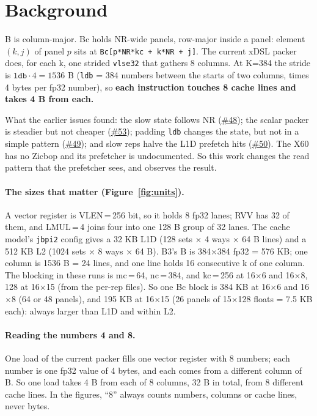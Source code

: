\documentclass[10pt,a4paper]{article}
\newcommand{\iss}[1]{\href{https://github.com/JieGH/RVV_code_gen_via_MLIR_xDSL/issues/#1}{\##1}}
\newcommand{\key}[1]{\textbf{\textcolor{blue!55!black}{#1}}}  %
\begin{document}
\section{Background}
B is column-major. Bc holds NR-wide panels, row-major inside a panel: element $(k,j)$ of panel $p$ sits at
\texttt{Bc[p*NR*kc + k*NR + j]}. The current xDSL packer does, for each k, one strided \texttt{vlse32} that gathers 8 columns.
At K=384 the stride is $\texttt{ldb}\cdot 4 = 1536$ B (\texttt{ldb} = 384 numbers between the starts of two columns, times 4 bytes per
fp32 number), so \key{each instruction touches 8 cache lines and takes 4 B from each.}

What the earlier issues found: the slow state follows NR (\iss{48}); the scalar packer is steadier but not cheaper (\iss{53});
padding \texttt{ldb} changes the state, but not in a simple pattern (\iss{49}); and slow reps halve the L1D prefetch hits (\iss{50}).
The X60 has no Zicbop and its prefetcher is undocumented. So this work changes the read pattern that the prefetcher sees, and
observes the result.

\paragraph{The sizes that matter (Figure~\ref{fig:units}).} A vector register is VLEN\,=\,256 bit, so it holds 8 fp32 lanes; RVV has
32 of them, and LMUL\,=\,4 joins four into one 128 B group of 32 lanes. The cache model's \texttt{jbpi2} config gives a 32 KB L1D
(128 sets $\times$ 4 ways $\times$ 64 B lines) and a 512 KB L2 (1024 sets $\times$ 8 ways $\times$ 64 B). B3's B is 384$\times$384 fp32
= 576 KB; one column is 1536 B = 24 lines, and one line holds 16 consecutive k of one column. The blocking in these runs is
mc\,=\,64, nc\,=\,384, and kc\,=\,256 at 16$\times$6 and 16$\times$8, 128 at 16$\times$15 (from the per-rep files). So one Bc block is
384 KB at 16$\times$6 and 16$\times$8 (64 or 48 panels), and 195 KB at 16$\times$15 (26 panels of 15$\times$128 floats = 7.5 KB each):
always larger than L1D and within L2.

\paragraph{Reading the numbers 4 and 8.} One load of the current packer fills one vector register with 8 numbers; each
number is one fp32 value of 4 bytes, and each comes from a different column of B. So one load takes 4 B from each of 8 columns,
32 B in total, from 8 different cache lines. In the figures, ``8'' always counts numbers, columns or cache lines, never bytes.
\end{document}
